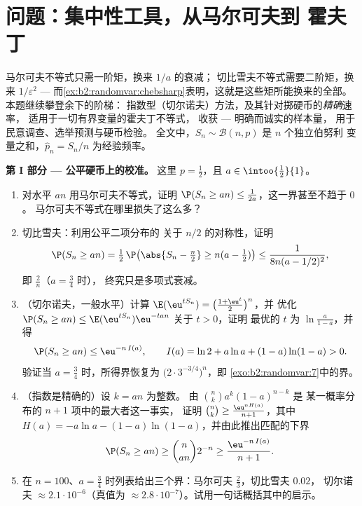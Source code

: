 \section{问题：集中性工具，从马尔可夫到
霍夫丁}

\begin{problem}
\label{pb:b2:randomvar:1}
马尔可夫不等式只需一阶矩，换来 $1/a$ 的衰减；
切比雪夫不等式需要二阶矩，换来 $1/\varepsilon^2$ ---
而\cref{ex:b2:randomvar:chebsharp}表明，这就是这些矩所能换来的全部。
本题继续攀登余下的阶梯：
指数型（切尔诺夫）方法，及其针对掷硬币的\emph{精确}速率，
适用于一切有界变量的霍夫丁不等式，
收获 --- 明确而诚实的样本量，
用于民意调查、选举预测与硬币检验。
全文中，$S_n \sim
\mathcal B(n, p)$ 是 $n$ 个独立伯努利
变量之和，$\widehat p_n = S_n/n$ 为经验频率。

\medskip
\noindent\textbf{第 I 部分 --- 公平硬币上的校准。}
这里 $p = \frac12$，且 $a \in \intoo{\frac12}{1}$。
\begin{enumerate}
  \item 对水平 $an$ 用马尔可夫不等式，证明 $\P(S_n \geq an) \leq
        \frac1{2a}$，这一界甚至不趋于 $0$。
        马尔可夫不等式在哪里损失了这么多？
  \item 切比雪夫：利用公平二项分布的
        关于 $n/2$ 的对称性，证明
        \[
        \P(S_n \geq an) = \tfrac12\,
        \P\bigl(\abs{S_n - \tfrac n2} \geq n(a -
        \tfrac12)\bigr)
        \leq \frac{1}{8n(a - 1/2)^2},
        \]
        即 $\frac2n$（$a = \frac34$ 时），
        终究只是多项式衰减。
  \item （切尔诺夫，一般水平）计算
        $\E(\eu^{tS_n}) = \bigl(\frac{1 + \eu^t}2\bigr)^n$，并
        优化 $\P(S_n \geq an) \leq
        \E(\eu^{tS_n})\eu^{-tan}$ 关于 $t > 0$，证明
        最优的 $t$ 为 $\ln\frac{a}{1-a}$，并得
        \[
        \P(S_n \geq an) \leq \eu^{-n\,I(a)},
        \qquad
        I(a) = \ln 2 + a\ln a + (1-a)\ln(1-a) > 0 .
        \]
        验证当 $a = \frac34$ 时，所得界恢复为
        $\bigl(2\cdot3^{-3/4}\bigr)^n$，即
        \cref{exo:b2:randomvar:7}中的界。
  \item （指数是精确的）设 $k = an$ 为整数。
        由 $\binom nk a^k(1-a)^{n-k}$ 是
        某一概率分布的 $n + 1$ 项中的最大者这一事实，
        证明 $\binom nk \geq
        \frac{\eu^{nH(a)}}{n+1}$，其中 $H(a) = -a\ln a -
        (1-a)\ln(1-a)$，并由此推出匹配的下界
        \[
        \P(S_n \geq an) \geq \binom{n}{an}2^{-n}
        \geq \frac{\eu^{-n\,I(a)}}{n + 1} .
        \]
  \item 在 $n = 100$、$a =
        \frac34$ 时列表给出三个界：马尔可夫 $\frac23$，切比雪夫 $0.02$，
        切尔诺夫 $\approx 2.1\cdot10^{-6}$（真值为
        $\approx 2.8\cdot10^{-7}$）。试用一句话概括其中的启示。
\end{enumerate}


\end{problem}
